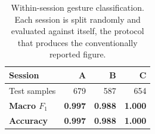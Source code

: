 \begin{table}[t]
\caption{Within-session gesture classification. Each session is split randomly and evaluated against itself, the protocol that produces the conventionally reported figure.}
\label{tab:persession}
\centering
\footnotesize
\setlength{\tabcolsep}{4pt}
\renewcommand{\arraystretch}{1.02}
\begin{tabular}{@{}lrrr@{}}
\toprule
Session & A & B & C \\
\midrule
Test samples & 679 & 587 & 654 \\
\textbf{Macro $F_1$} & \textbf{0.997} & \textbf{0.988} & \textbf{1.000}\\
\textbf{Accuracy} & \textbf{0.997} & \textbf{0.988} & \textbf{1.000}\\
\bottomrule
\end{tabular}
\end{table}
